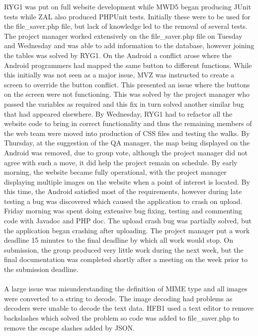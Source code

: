 \documentclass[12pt, portrait]{article}
\begin{document}
RYG1 was put on full website development while MWD5 began producing JUnit tests while ZAL also produced PHPUnit tests. Initially these were to be used for the file\_saver.php file, but lack of knowledge led to the removal of several tests. The project manager worked extensively on the file\_saver.php file on Tuesday and Wednesday and was able to add information to the database, however joining the tables was solved by RYG1. On the Android a conflict arose where the Android programmers had mapped the same button to different functions. While this initially was not seen as a major issue, MVZ was instructed to create a screen to override the button conflict. This presented an issue where the buttons on the screen were not functioning. This was solved by the project manager who passed the variables as required and this fix in turn solved another similar bug that had appeared elsewhere. By Wednesday, RYG1 had to refactor all the website code to bring in correct functionality and thus the remaining members of the web team were moved into production of CSS files and testing the walks. By Thursday, at the suggestion of the QA manager, the map being displayed on the Android was removed, due to group vote, although the project manager did not agree with such a move, it did help the project remain on schedule. By early morning, the website became fully operational, with the project manager displaying multiple images on the website when a point of interest is located. By this time, the Android satisfied most of the requirements, however during late testing a bug was discovered which caused the application to crash on upload. Friday morning was spent doing extensive bug fixing, testing and commenting code with Javadoc and PHP doc. The upload crash bug was partially solved, but the application began crashing after uploading. The project manager put a work deadline 15 minutes to the final deadline by which all work would stop. On submission, the group produced very little work during the next week, but the final documentation was completed shortly after a meeting on the week prior to the submission deadline.
\\\\
A large issue was misunderstanding the definition of MIME type and all images were converted to a string to decode. The image decoding had problems as decoders were unable to decode the text data. HFB1 used a text editor to remove backslashes which solved the problem so code was added to file\_saver.php to remove the escape slashes added by JSON.
\newpage 
\end{document}
